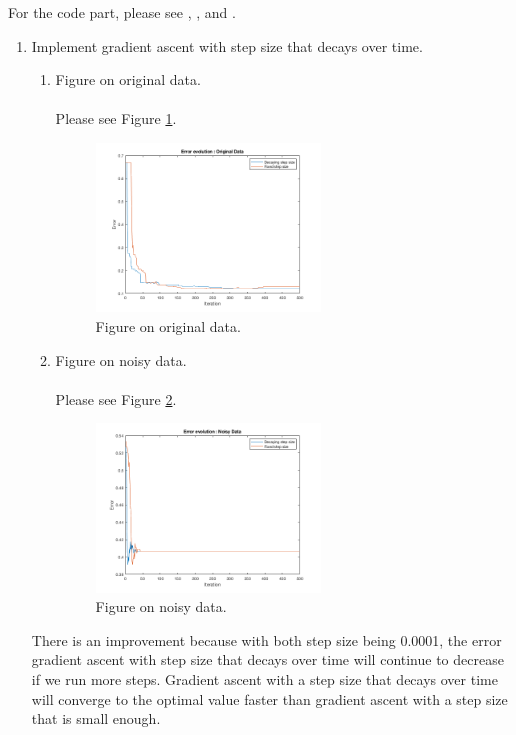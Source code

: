 \documentclass[english]{article}
\begin{document}
\begin{enumerate}[label=(\roman*)]
    For the code part, please see , ,  and .\\
    \begin{enumerate}
      \item Implement gradient ascent with step size that decays over time.
      \begin{enumerate}
        \item Figure on original data.\\ \\
        Please see Figure \ref{fig:311}. \\
        \begin{figure}[H]
          \centering
          \includegraphics[width=0.6\textwidth]{311.png}
          \caption{Figure on original data.}
          \label{fig:311}
        \end{figure}
        \item Figure on noisy data.\\ \\
        Please see Figure \ref{fig:312}. \\
        \begin{figure}[H]
          \centering
          \includegraphics[width=0.6\textwidth]{312.png}
          \caption{Figure on noisy data.}
          \label{fig:312}
        \end{figure}
      \end{enumerate}
      There is an improvement because with both step size being 0.0001, the error gradient ascent with step size that decays over time will continue to decrease if we run more steps. Gradient ascent with a step size that decays over time will converge to the optimal value faster than gradient ascent with a step size that is small enough. \\


\end{enumerate}
\end{enumerate}
\end{document}
